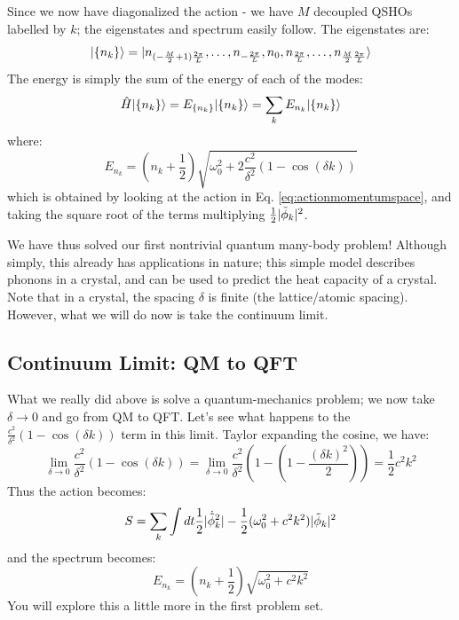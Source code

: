 Since we now have diagonalized the action - we have $M$ decoupled QSHOs labelled by $k$; the eigenstates and spectrum easily follow. The eigenstates are:
\begin{equation}
    \lvert \set{n_k} \rangle = \lvert n_{(-\frac{M}{2} + 1)\frac{2\pi}{L}}, \ldots, n_{-\frac{2\pi}{L}}, n_0, n_{\frac{2\pi}{L}}, \ldots, n_{\frac{M}{2}\frac{2\pi}{L}} \rangle
\end{equation}
The energy is simply the sum of the energy of each of the modes:
\begin{equation}
    \hat{H}\lvert \set{n_k} \rangle = E_{\set{n_k}}\lvert \set{n_k} \rangle = \sum_k E_{n_k}\lvert \set{n_k} \rangle
\end{equation}
where:
\begin{equation}
    E_{n_k} = (n_k + \frac{1}{2})\sqrt{\omega_0^2 + 2\frac{c^2}{\delta^2}(1-\cos(\delta k))}
\end{equation}
which is obtained by looking at the action in Eq. \eqref{eq:actionmomentumspace}, and taking the square root of the terms multiplying $\frac{1}{2}\lvert \tilde{\phi}_k \rvert^2$. 

We have thus solved our first nontrivial quantum many-body problem! Although simply, this already has applications in nature; this simple model describes phonons in a crystal, and can be used to predict the heat capacity of a crystal. Note that in a crystal, the spacing $\delta$ is finite (the lattice/atomic spacing). However, what we will do now is take the continuum limit.

\subsection{Continuum Limit: QM to QFT}
What we really did above is solve a quantum-mechanics problem; we now take $\delta \to 0$ and go from QM to QFT. Let's see what happens to the $\frac{c^2}{\delta^2}(1-\cos(\delta k))$ term in this limit. Taylor expanding the cosine, we have:
\begin{equation}
    \lim_{\delta \to 0 }\frac{c^2}{\delta^2}(1 - \cos(\delta k)) = \lim_{\delta \to 0}\frac{c^2}{\delta^2}\left(1 - \left(1 - \frac{(\delta k)^2}{2}\right)\right) = \frac{1}{2}c^2k^2
\end{equation}
Thus the action becomes:
\begin{equation}
    S = \sum_k \int dt \frac{1}{2}\lvert \dot{\tilde{\phi}}_k^2 \rvert - \frac{1}{2}(\omega_0^2 + c^2k^2)\lvert \tilde{\phi}_k \rvert^2
\end{equation}
and the spectrum becomes:
\begin{equation}
    E_{n_k} = (n_k + \frac{1}{2})\sqrt{\omega_0^2 + c^2k^2}
\end{equation}
You will explore this a little more in the first problem set.

